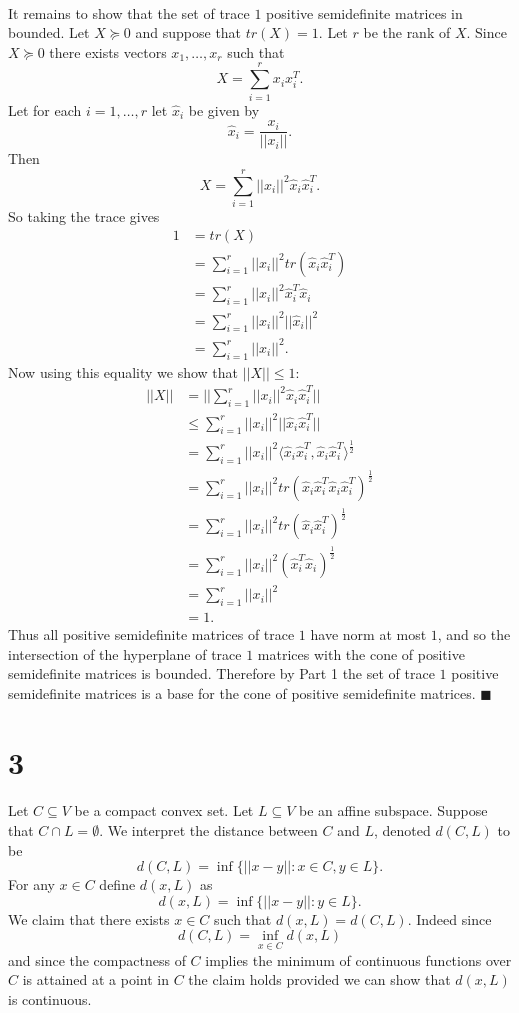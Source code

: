 \documentclass[letterpaper,12pt,oneside,onecolumn]{article}
\begin{document}
\paragraph{}
It remains to show that the set of trace $1$ positive semidefinite matrices in bounded. Let $X\succcurlyeq 0$ and suppose that $tr(X) = 1$. Let $r$ be the rank of $X$. Since $X \succcurlyeq 0$ there exists vectors $x_1, \dots, x_r$ such that
$$ X = \sum_{i=1}^r x_ix_i^T.$$
Let for each $i = 1,\dots,r$ let $\hat{x}_i$ be given by
$$ \hat{x}_i = \frac{x_i}{||x_i||}.$$
Then $$X = \sum_{i=1}^r ||x_i||^2 \hat{x}_i\hat{x}_i^T.$$
So taking the trace gives
\begin{align*}
1 &= tr(X) \\
&= \sum_{i=1}^r ||x_i||^2 tr(\hat{x}_i \hat{x}_i^T) \\
&= \sum_{i=1}^r ||x_i||^2 \hat{x}_i^T \hat{x}_i \\
&= \sum_{i=1}^r ||x_i||^2 ||\hat{x}_i||^2 \\
&= \sum_{i=1}^r ||x_i||^2.
\end{align*}
Now using this equality we show that $||X|| \leq 1$:
\begin{align*}
||X|| &= ||\sum_{i=1}^r ||x_i||^2 \hat{x}_i\hat{x}_i^T|| \\
&\leq \sum_{i=1}^r ||x_i||^2 ||\hat{x}_i\hat{x}_i^T|| \\
&= \sum_{i=1}^r ||x_i||^2 \langle \hat{x}_i \hat{x}_i^T, \hat{x}_i \hat{x}_i^T\rangle^{\frac{1}{2}} \\
&= \sum_{i=1}^r ||x_i||^2 tr(\hat{x}_i \hat{x}_i^T\hat{x}_i \hat{x}_i^T)^{\frac{1}{2}} \\
&= \sum_{i=1}^r ||x_i||^2 tr(\hat{x}_i \hat{x}_i^T)^\frac{1}{2} \\
&= \sum_{i=1}^r ||x_i||^2 (\hat{x}_i^T\hat{x}_i) ^\frac{1}{2} \\
&= \sum_{i=1}^r ||x_i||^2 \\
&= 1.
\end{align*}
Thus all positive semidefinite matrices of trace $1$ have norm at most $1$, and so the intersection of the hyperplane of trace $1$ matrices with the cone of positive semidefinite matrices is bounded. Therefore by Part 1 the set of trace $1$ positive semidefinite matrices is a base for the cone of positive semidefinite matrices. $\blacksquare$
\section*{3}
\paragraph{}
Let $C\subseteq V$ be a compact convex set. Let $L\subseteq V$ be an affine subspace. Suppose that $C \cap L = \emptyset$. We interpret the distance between $C$ and $L$, denoted $d(C,L)$ to be
$$d(C,L) = \inf \{||x - y|| : x \in C, y\in L\}.$$
For any $x \in C$ define $d(x,L)$ as
$$d(x,L) = \inf \{||x-y|| : y \in L\}.$$
We claim that there exists $x \in C$ such that $d(x,L) = d(C,L)$. Indeed since
$$d(C,L) = \inf_{x \in C} d(x,L)$$
and since the compactness of $C$ implies the minimum of continuous functions over $C$ is attained at a point in $C$ the claim holds provided we can show that $d(x,L)$ is continuous.
\end{document}
